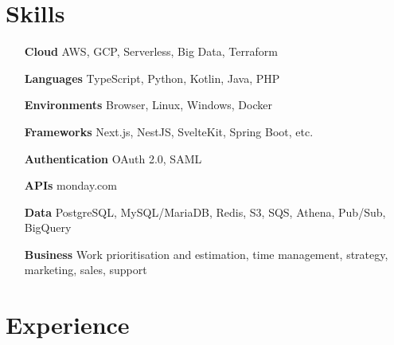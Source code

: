 \documentclass[a4paper,10pt]{article}
\begin{document}

          \section{Skills}

          \begin{multicols}{2}
            \begin{itemize}[itemsep=-2px, parsep=1pt, leftmargin=75pt]
                \item[\textbf{Cloud}] AWS, GCP, Serverless, Big Data, Terraform
                \item[\textbf{Languages}] TypeScript, Python, Kotlin, Java, PHP
                \item[\textbf{Environments}] Browser, Linux, Windows, Docker
                \item[\textbf{Frameworks}] Next.js, NestJS, SvelteKit, Spring Boot, etc.
                \item[\textbf{Authentication}] OAuth 2.0, SAML
                \item[\textbf{APIs}] monday.com
                \item[\textbf{Data}] PostgreSQL, MySQL/MariaDB, Redis, S3, SQS, Athena, Pub/Sub, BigQuery
                \item[\textbf{Business}] Work prioritisation and estimation, time management, strategy, marketing, sales, support
            \end{itemize}
          \end{multicols}



          \section{Experience}
\end{document}
